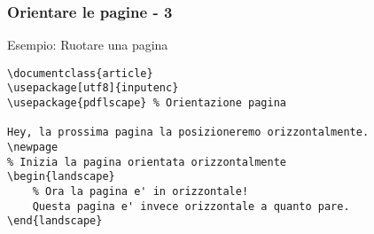 \begin{frame}[fragile]
 \frametitle{Orientare le pagine - 3}
 \begin{exampleblock}{Esempio: Ruotare una pagina}
\begin{code}
\begin{verbatim}
\documentclass{article}
\usepackage[utf8]{inputenc}
\usepackage{pdflscape} % Orientazione pagina

Hey, la prossima pagina la posizioneremo orizzontalmente.
\newpage
% Inizia la pagina orientata orizzontalmente
\begin{landscape}
    % Ora la pagina e' in orizzontale!
    Questa pagina e' invece orizzontale a quanto pare.
\end{landscape}

\end{verbatim}
  \end{code}
 \end{exampleblock}

\end{frame}
